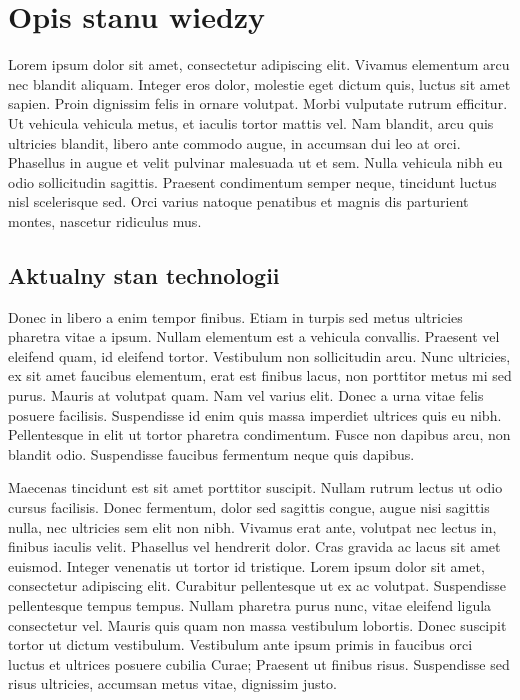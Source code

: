 \chapter{Opis stanu wiedzy} 
Lorem ipsum dolor sit amet, consectetur adipiscing elit. Vivamus elementum arcu nec blandit aliquam. Integer eros dolor, molestie eget dictum quis, luctus sit amet sapien. Proin dignissim felis in ornare volutpat. Morbi vulputate rutrum efficitur. Ut vehicula vehicula metus, et iaculis tortor mattis vel. Nam blandit, arcu quis ultricies blandit, libero ante commodo augue, in accumsan dui leo at orci. Phasellus in augue et velit pulvinar malesuada ut et sem. Nulla vehicula nibh eu odio sollicitudin sagittis. Praesent condimentum semper neque, tincidunt luctus nisl scelerisque sed. Orci varius natoque penatibus et magnis dis parturient montes, nascetur ridiculus mus.

\section{Aktualny stan technologii}
Donec in libero a enim tempor finibus. Etiam in turpis sed metus ultricies pharetra vitae a ipsum. Nullam elementum est a vehicula convallis. Praesent vel eleifend quam, id eleifend tortor. Vestibulum non sollicitudin arcu. Nunc ultricies, ex sit amet faucibus elementum, erat est finibus lacus, non porttitor metus mi sed purus. Mauris at volutpat quam. Nam vel varius elit. Donec a urna vitae felis posuere facilisis. Suspendisse id enim quis massa imperdiet ultrices quis eu nibh. Pellentesque in elit ut tortor pharetra condimentum. Fusce non dapibus arcu, non blandit odio. Suspendisse faucibus fermentum neque quis dapibus.

Maecenas tincidunt est sit amet porttitor suscipit. Nullam rutrum lectus ut odio cursus facilisis. Donec fermentum, dolor sed sagittis congue, augue nisi sagittis nulla, nec ultricies sem elit non nibh. Vivamus erat ante, volutpat nec lectus in, finibus iaculis velit. Phasellus vel hendrerit dolor. Cras gravida ac lacus sit amet euismod. Integer venenatis ut tortor id tristique. Lorem ipsum dolor sit amet, consectetur adipiscing elit. Curabitur pellentesque ut ex ac volutpat. Suspendisse pellentesque tempus tempus. Nullam pharetra purus nunc, vitae eleifend ligula consectetur vel. Mauris quis quam non massa vestibulum lobortis. Donec suscipit tortor ut dictum vestibulum. Vestibulum ante ipsum primis in faucibus orci luctus et ultrices posuere cubilia Curae; Praesent ut finibus risus. Suspendisse sed risus ultricies, accumsan metus vitae, dignissim justo.

